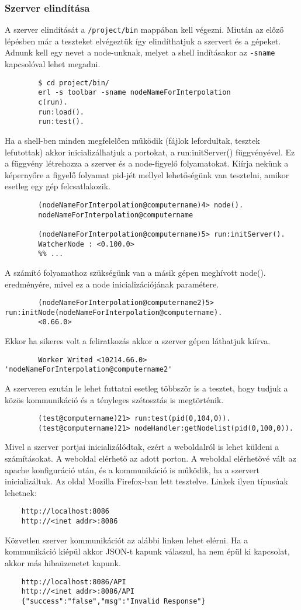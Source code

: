 \subsubsection{Szerver elindítása}
	A szerver elindítását a \texttt{/project/bin} mappában kell végezni. Miután az előző lépésben már a teszteket elvégeztük így elindíthatjuk a szervert és a gépeket.
	Adnunk kell egy nevet a node-unknak, melyet a shell indításakor az \texttt{-sname} kapcsolóval lehet megadni.
	\begin{verbatim}
		$ cd project/bin/
		erl -s toolbar -sname nodeNameForInterpolation
		c(run).
		run:load().
		run:test().
	\end{verbatim}
	Ha a shell-ben minden megfelelően működik (fájlok lefordultak, tesztek lefutottak) akkor inicializálhatjuk a portokat, a run:initServer() függvényével. Ez a függvény létrehozza a szerver és a node-figyelő folyamatokat. Kiírja nekünk a képernyőre a figyelő folyamat pid-jét mellyel lehetőségünk van tesztelni, amikor esetleg egy gép felcsatlakozik. 
	\begin{verbatim}
		(nodeNameForInterpolation@computername)4> node().
		nodeNameForInterpolation@computername

		(nodeNameForInterpolation@computername)5> run:initServer().
		WatcherNode : <0.100.0>
		%% ...
	\end{verbatim}
	A számító folyamathoz szükségünk van a másik gépen meghívott node(). eredményére, mivel ez a node inicializációjának paramétere. 
	\begin{verbatim}
		(nodeNameForInterpolation@computername2)5> run:initNode(nodeNameForInterpolation@computername).
		<0.66.0>
	\end{verbatim}
	Ekkor ha sikeres volt a feliratkozás akkor a szerver gépen láthatjuk kiírva.
	\begin{verbatim}
		Worker Writed <10214.66.0> 'nodeNameForInterpolation@computername2'
	\end{verbatim}
	A szerveren ezután le lehet futtatni esetleg többször is a tesztet, hogy tudjuk a közös kommunikáció és a tényleges szétosztás is megtörténik.
	\begin{verbatim}
		(test@computername)21> run:test(pid(0,104,0)).
		(test@computername)21> nodeHandler:getNodelist(pid(0,100,0)).
	\end{verbatim}
	Mivel a szerver portjai inicializálódtak, ezért a weboldalról is lehet küldeni a számításokat. 
	A weboldal elérhető az adott porton. A weboldal elérhetővé vált az apache konfiguráció után, és a kommunikáció is működik, ha a szervert inicializáltuk. Az oldal Mozilla Firefox-ban lett tesztelve. Linkek ilyen típusúak lehetnek: 
	\begin{verbatim}
	http://localhost:8086
	http://<inet addr>:8086
	\end{verbatim}
	Közvetlen szerver kommunikációt az alábbi linken lehet elérni. 
	Ha a kommunikáció kiépül akkor JSON-t kapunk válaszul, ha nem épül ki kapcsolat, akkor más hibaüzenetet kapunk. 
	\begin{verbatim}
	http://localhost:8086/API
	http://<inet addr>:8086/API 
	{"success":"false","msg":"Invalid Response"}
	\end{verbatim}
